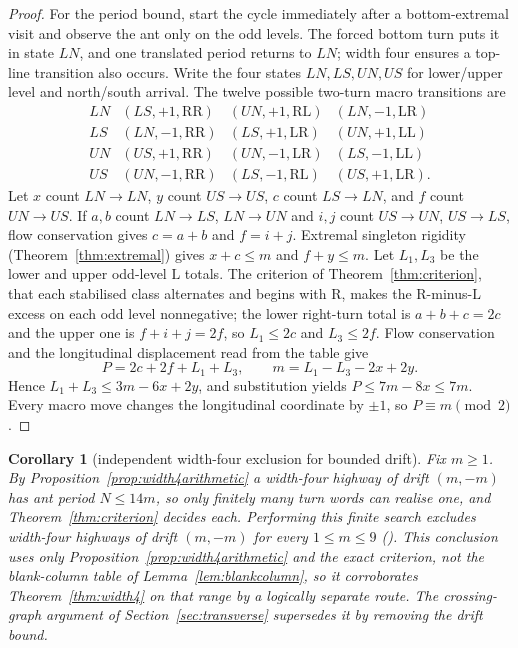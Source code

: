 \documentclass[11pt,letterpaper]{article}
\theoremstyle{plain}
\newtheorem{corollary}[theorem]{Corollary}
\theoremstyle{definition}
\newcommand{\turnR}{\mathrm{R}}
\newcommand{\turnL}{\mathrm{L}}
\begin{document}
\begin{NoHyper}
\begin{proof}
For the period bound, start the cycle immediately after a bottom-extremal visit and
observe the ant only on the odd levels. The forced bottom turn puts it in state
$LN$, and one translated period returns to $LN$; width four ensures a top-line
transition also occurs. Write the four states $LN,LS,UN,US$ for lower/upper level and
north/south arrival. The twelve possible two-turn macro transitions are
\[
\begin{array}{c|ccc}
LN&(LS,+1,\mathrm{RR})&(UN,+1,\mathrm{RL})&(LN,-1,\mathrm{LR})\\
LS&(LN,-1,\mathrm{RR})&(LS,+1,\mathrm{LR})&(UN,+1,\mathrm{LL})\\
UN&(US,+1,\mathrm{RR})&(UN,-1,\mathrm{LR})&(LS,-1,\mathrm{LL})\\
US&(UN,-1,\mathrm{RR})&(LS,-1,\mathrm{RL})&(US,+1,\mathrm{LR}).
\end{array}
\]
Let $x$ count $LN\to LN$, $y$ count $US\to US$, $c$ count $LS\to LN$, and $f$ count
$UN\to US$. If $a,b$ count $LN\to LS$, $LN\to UN$ and $i,j$ count $US\to UN$,
$US\to LS$, flow conservation gives $c=a+b$ and $f=i+j$. Extremal singleton rigidity
(Theorem~\ref{thm:extremal}) gives $x+c\le m$ and $f+y\le m$. Let $L_1,L_3$ be the
lower and upper odd-level $\turnL$ totals. The criterion of
Theorem~\ref{thm:criterion}, that each stabilised class alternates and begins with
$\turnR$, makes the $\turnR$-minus-$\turnL$ excess on each odd level nonnegative; the
lower right-turn total is $a+b+c=2c$ and the upper one is $f+i+j=2f$, so $L_1\le2c$
and $L_3\le2f$. Flow conservation and the longitudinal displacement read from the
table give
\[
P=2c+2f+L_1+L_3,\qquad m=L_1-L_3-2x+2y.
\]
Hence $L_1+L_3\le3m-6x+2y$, and substitution yields $P\le7m-8x\le7m$. Every macro
move changes the longitudinal coordinate by $\pm1$, so $P\equiv m\pmod2$.
\end{proof}

\begin{corollary}[independent width-four exclusion for bounded drift]\label{cor:width4bounded}
Fix $m\ge1$. By Proposition~\ref{prop:width4arithmetic} a width-four highway of drift
$(m,-m)$ has ant period $N\le14m$, so only finitely many turn words can realise one,
and Theorem~\ref{thm:criterion} decides each. Performing this finite search excludes
width-four highways of drift $(m,-m)$ for every $1\le m\le9$
(). This conclusion uses only
Proposition~\ref{prop:width4arithmetic} and the exact criterion, not the
blank-column table of Lemma~\ref{lem:blankcolumn}, so it corroborates
Theorem~\ref{thm:width4} on that range by a logically separate route. The
crossing-graph argument of Section~\ref{sec:transverse} supersedes it by removing the
drift bound.
\end{corollary}


\clearpage
\end{NoHyper}
\end{document}
